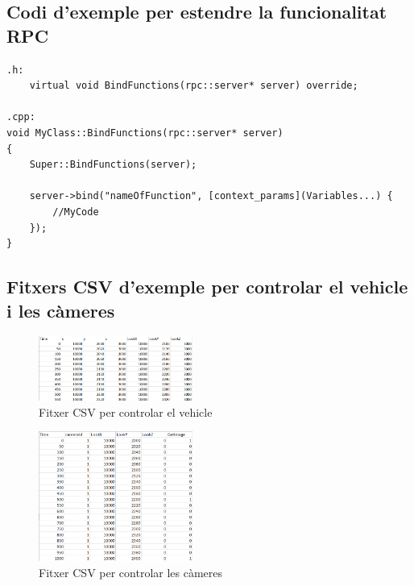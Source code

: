 \documentclass[10pt,a4paper,twocolumn,twoside]{article}
\begin{document}
\subsection{Codi d'exemple per estendre la funcionalitat RPC}
\label{appendix:extendrpc}

\lstset{language=C} 
\begin{lstlisting}
.h:
	virtual void BindFunctions(rpc::server* server) override;
	
.cpp:
void MyClass::BindFunctions(rpc::server* server)
{
	Super::BindFunctions(server);

	server->bind("nameOfFunction", [context_params](Variables...) {
		//MyCode
	});
}

\end{lstlisting}

\subsection{Fitxers CSV d'exemple per controlar el vehicle i les càmeres}
\label{appendix:fitxerscsv}

\begin{figure}[!h]
\centering
  	\includegraphics[width=0.45\textwidth]{fitxervehicle}
	\captionsetup{labelformat=empty}
	\caption{Fitxer CSV per controlar el vehicle}
	\label{fig-fitxervehicle}
\end{figure}


\begin{figure}[!h]
\centering
  	\includegraphics[width=0.45\textwidth]{fitxercameres}
  	\captionsetup{labelformat=empty}
	\caption{Fitxer CSV per controlar les càmeres}
	\label{fig-fitxercameres}
\end{figure}
\end{document}
